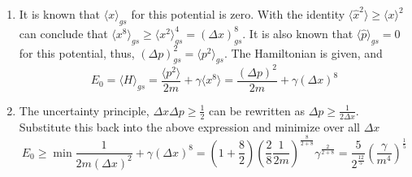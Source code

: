 \begin{sol}
\begin{enumerate}[label=\textbf{(\alph*)}]
\item
It is known that $\langle x\rangle_{gs}$ for this potential is zero. With the identity $\langle \hat x^2\rangle\geq\langle x\rangle^2$ can conclude that $\langle x^8\rangle_{gs}\geq\langle x^2\rangle^4_{gs}=(\Delta x)^8_{gs}$. It is also known that $\langle\hat p\rangle_{gs}=0$ for this potential, thus, $(\Delta p)_{gs}^2=\langle p^2\rangle_{gs}$. The Hamiltonian is given, and 
\begin{equation}
	E_0=\langle H\rangle_{gs}=\frac{\langle p^2\rangle}{2m}+\gamma\langle x^8\rangle=\frac{(\Delta p)^2}{2m}+\gamma(\Delta x)^8
\end{equation}
\item
The uncertainty principle, $\Delta x\Delta p\geq\frac{1}{2}$ can be rewritten as $\Delta p\geq\frac{1}{2\Delta x}$. Substitute this back into the above expression and minimize over all $\Delta x$
\begin{equation}
	E_0\geq\min\frac{1}{2m(\Delta x)^2}+\gamma(\Delta x)^8=\left(1+\frac{8}{2}\right)\left(\frac{2}{8}\frac{1}{2m}\right)^\frac{8}{2+8}\gamma^\frac{2}{2+8}=\frac{5}{2^\frac{12}{5}}\left(\frac{\gamma}{m^4}\right)^\frac{1}{5}
\end{equation}
\end{enumerate}
\end{sol}